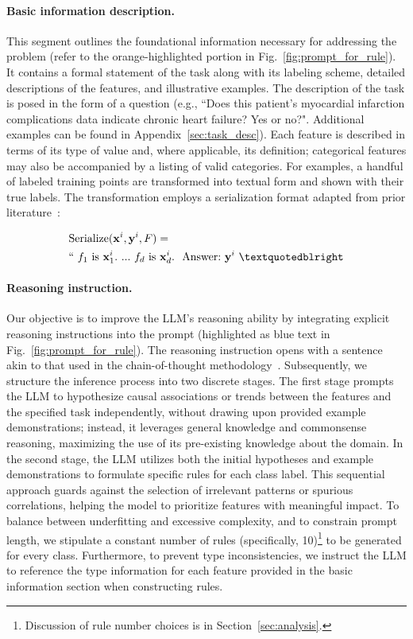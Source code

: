 \vspace*{-0.12in}
\paragraph{Basic information description.} This segment outlines the foundational information necessary for addressing the problem (refer to the orange-highlighted portion in Fig.~\ref{fig:prompt_for_rule}). It contains a formal statement of the task along with its labeling scheme, detailed descriptions of the features, and illustrative examples. The description of the task is posed in the form of a question (e.g., ``Does this patient's myocardial infarction complications data indicate chronic heart failure? Yes or no?". Additional examples can be found in Appendix~\ref{sec:task_desc}). Each feature is described in terms of its type of value and, where applicable, its definition; categorical features may also be accompanied by a listing of valid categories. For examples, a handful of labeled training points are transformed into textual form and shown with their true labels. The transformation employs a serialization format adapted from prior literature~\cite{dinh2022lift,hegselmann2023tabllm}:

\begin{align}
&\text{Serialize}(\mathbf{x}^i,\mathbf{y}^i, F) = \nonumber \\ 
&``\ f_1\ \text{is}\ \mathbf{x}^i_1.\ ... \ f_d\  \text{is}\  \mathbf{x}^i_d.\ \ \text{Answer:}\  \mathbf{y}^i\ ”
\end{align}

\vspace*{-0.12in}
\paragraph{Reasoning instruction.} Our objective is to improve the LLM's reasoning ability by integrating explicit reasoning instructions into the prompt (highlighted as blue text in Fig.~\ref{fig:prompt_for_rule}). The reasoning instruction opens with a sentence akin to that used in the chain-of-thought methodology~\cite{wei2022chain}. Subsequently, we structure the inference process into two discrete stages. The first stage prompts the LLM to hypothesize causal associations or trends between the features and the specified task independently, without drawing upon provided example demonstrations; instead, it leverages general knowledge and commonsense reasoning, maximizing the use of its pre-existing knowledge about the domain. In the second stage, the LLM utilizes both the initial hypotheses and example demonstrations to formulate specific rules for each class label. This sequential approach guards against the selection of irrelevant patterns or spurious correlations, helping the model to prioritize features with meaningful impact. To balance between underfitting and excessive complexity, and to constrain prompt length, we stipulate a constant number of rules (specifically, 10)\footnote{Discussion of rule number choices is in Section~\ref{sec:analysis}.} to be generated for every class. Furthermore, to prevent type inconsistencies, we instruct the LLM to reference the type information for each feature provided in the basic information section when constructing rules.

